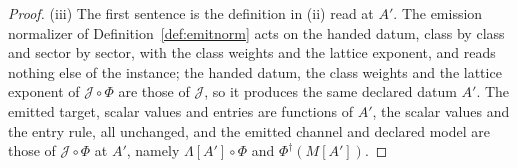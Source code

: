 \begin{proof}
(iii) The first sentence is the definition in (ii) read at $A'$. The emission
normalizer of Definition~\ref{def:emitnorm} acts on the handed datum, class by
class and sector by sector, with the class weights and the lattice exponent,
and reads nothing else of the instance; the handed datum, the class weights
and the lattice exponent of $\mathcal{J}\circ\Phi$ are those of $\mathcal{J}$,
so it produces the same declared datum $A'$. The emitted target, scalar values
and entries are functions of $A'$, the scalar values and the entry rule, all
unchanged, and the emitted channel and declared model are those of
$\mathcal{J}\circ\Phi$ at $A'$, namely $\Lambda[A']\circ\Phi$ and
$\Phi^{\dagger}(M[A'])$.
\end{proof}
